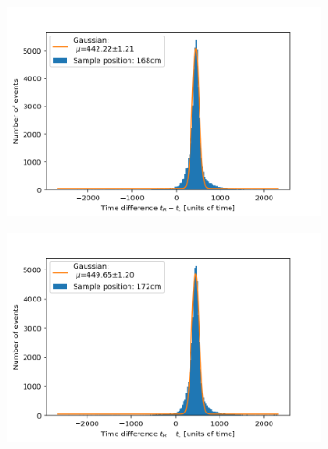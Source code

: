 \documentclass[]{article}
\begin{document}
\begin{figure}[H]
\medskip
\begin{subfigure}{0.48\textwidth}
\includegraphics[width=\linewidth]{Plots/Pos/168cm.png}
\end{subfigure}
\begin{subfigure}[c]{0.48\linewidth}
\includegraphics[width=\linewidth]{Plots/Pos/172cm.png}
\end{subfigure}


\end{figure}
\end{document}
